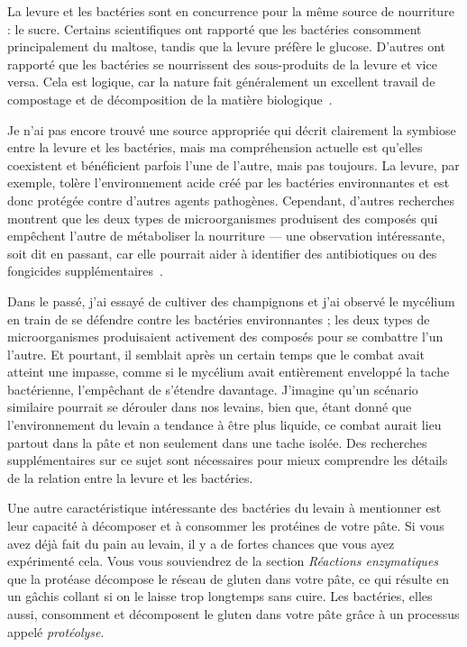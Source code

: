 La levure et les bactéries sont en concurrence pour la même source de nourriture : le sucre. Certains scientifiques ont rapporté que les bactéries consomment principalement du maltose, tandis que la levure préfère le glucose. D'autres ont rapporté que les bactéries se nourrissent des sous-produits de la levure et vice
versa. Cela est logique, car la nature fait généralement un excellent travail de compostage et de décomposition de la matière biologique~\cite{lactobacillus+sanfrancisco}.

Je n'ai pas encore trouvé une source appropriée qui décrit clairement la symbiose entre
la levure et les bactéries, mais ma compréhension actuelle est qu'elles coexistent et
bénéficient parfois l'une de l'autre, mais pas toujours. La levure, par exemple, tolère l'environnement acide créé par les bactéries environnantes et est donc protégée
contre d'autres agents pathogènes. Cependant, d'autres recherches montrent que les deux
types de microorganismes produisent des composés qui empêchent l'autre de
métaboliser la nourriture --- une observation intéressante, soit dit en passant, car elle pourrait aider à
identifier des antibiotiques ou des fongicides supplémentaires~\cite{mold+lactic+acid+bacteria}.

Dans le passé, j'ai essayé de cultiver des champignons et j'ai observé le mycélium
en train de se défendre contre les bactéries environnantes ; les deux types de
microorganismes produisaient activement des composés pour se combattre l'un l'autre. Et pourtant,
il semblait après un certain temps que le combat avait atteint une impasse, comme si le mycélium avait
entièrement enveloppé la tache bactérienne, l'empêchant de s'étendre davantage. 
J'imagine qu'un scénario similaire pourrait se dérouler dans nos levains, bien que, étant donné que l'environnement du levain a tendance à être plus liquide, ce combat aurait lieu partout dans la pâte et non seulement dans une tache isolée. Des recherches supplémentaires sur ce sujet sont nécessaires pour mieux comprendre
les détails de la relation entre la levure et les bactéries.

Une autre caractéristique intéressante des bactéries du levain à mentionner est leur
capacité à décomposer et à consommer les protéines de votre pâte. Si vous avez déjà fait du pain au levain, il y a de fortes chances que vous ayez expérimenté cela. Vous vous souviendrez de la section \emph{Réactions enzymatiques} que la protéase décompose le
réseau de gluten dans votre pâte, ce qui résulte en un gâchis collant si on le laisse trop longtemps sans cuire. Les bactéries, elles aussi, consomment et décomposent le gluten dans votre
pâte grâce à un processus appelé \emph{protéolyse}.

